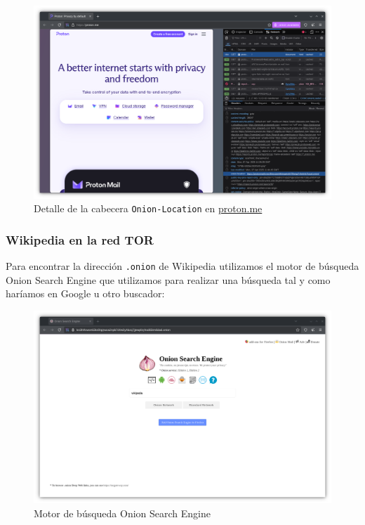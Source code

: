 \begin{figure}[H]
    \centering
    \includegraphics[width=\textwidth]{proton.me-onion-header.png}
    \caption{Detalle de la cabecera \texttt{Onion-Location} en \url{proton.me}}
\end{figure}

\subsubsection{Wikipedia en la red TOR}

Para encontrar la dirección \texttt{.onion} de Wikipedia utilizamos el motor de búsqueda Onion Search Engine que utilizamos para realizar una búsqueda tal y como haríamos en Google u otro buscador:

\begin{figure}[H]
    \centering
    \includegraphics[width=\textwidth]{tor-onionengine.png}
    \caption{Motor de búsqueda Onion Search Engine}
\end{figure}

